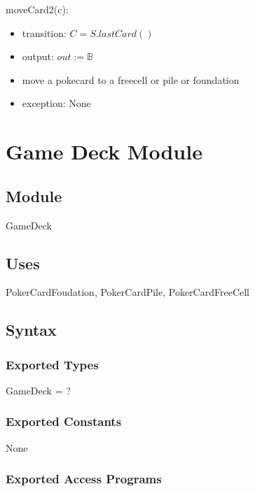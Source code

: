 \documentclass[12pt]{article}
\begin{document}
\noindent moveCard2(c):
\begin{itemize}
\item transition: $C=S.lastCard()$
\item output: $out :=  \mathbb{B}$
\item move a pokecard to a freecell or pile or foundation
\item exception: None
\end{itemize}
\newpage
\section* {Game Deck Module}

\subsection* {Module}

GameDeck

\subsection* {Uses}

PokerCardFoudation, PokerCardPile, PokerCardFreeCell

\subsection* {Syntax}

\subsubsection* {Exported Types}

GameDeck = ?

\subsubsection* {Exported Constants}

None

\subsubsection* {Exported Access Programs}
\end{document}
